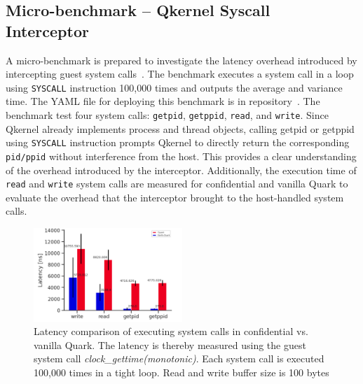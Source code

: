 \subsection{Micro-benchmark – Qkernel Syscall Interceptor}
\label{bench_Interceptor}

A micro-benchmark is prepared to investigate the latency overhead introduced by intercepting guest system calls~\cite*{benchamark_systemcall_intercetion}. The benchmark executes a system call in a loop using \texttt{SYSCALL} instruction 100,000 times and outputs the average and variance time. The YAML file for deploying this benchmark is 
in repository~\cite*{perf_test_repo}. The benchmark test four system calls: \texttt{getpid}, \texttt{getppid}, \texttt{read}, and \texttt{write}. Since Qkernel already implements process and thread objects, calling getpid or getppid using \texttt{SYSCALL} instruction prompts Qkernel to directly return the corresponding \texttt{pid/ppid} without interference from the 
host. This provides a clear understanding of the overhead introduced by the interceptor. Additionally, the execution time of \texttt{read} and \texttt{write} system calls are measured for confidential and vanilla Quark to evaluate the overhead that the interceptor brought to the host-handled system calls.

\begin{figure}[!htb]
    \centering
    \includegraphics[width=0.5\textwidth]{images/ben_results_syscall_interceptor.PNG}
    \caption[Benchmark result of Syscall Interceptor]{Latency comparison of executing system calls in confidential vs. vanilla Quark. The latency is thereby measured using the guest system call \emph{clock\_gettime(monotonic)}. 
        Each system call is executed 100,000  times in a tight loop. Read and write buffer size is 100 bytes}
    \label{fig:ben_results_syscall_interceptor}
\end{figure}

